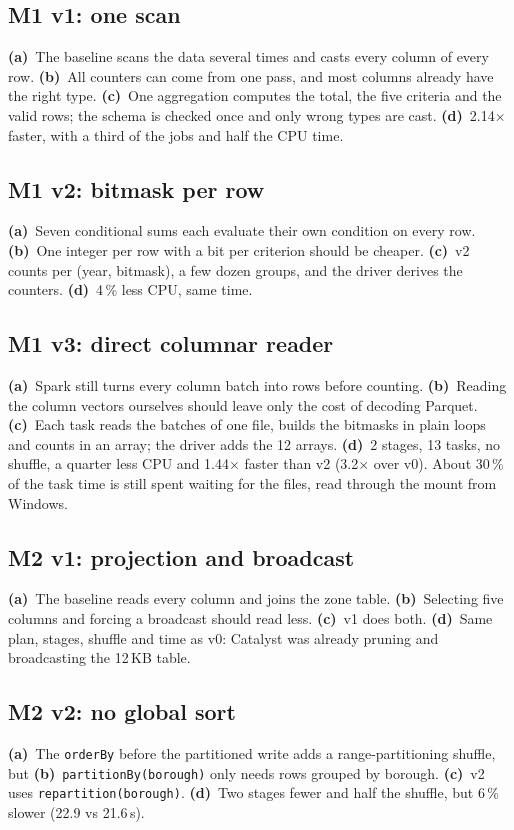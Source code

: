 \documentclass[sigconf]{acmart}
\newcommand{\pa}{\textbf{(a)}~}\newcommand{\pb}{\textbf{(b)}~}\newcommand{\pc}{\textbf{(c)}~}\newcommand{\pd}{\textbf{(d)}~}
\begin{document}
\subsection{M1 v1: one scan}
\pa The baseline scans the data several times and casts every column of every row. \pb All counters can come from one pass, and
most columns already have the right type. \pc One aggregation computes the total, the five criteria and the valid rows; the schema
is checked once and only wrong types are cast. \pd 2.14$\times$ faster, with a third of the jobs and half the CPU time.

\subsection{M1 v2: bitmask per row}
\pa Seven conditional sums each evaluate their own condition on every row. \pb One integer per row with a bit per criterion should be
cheaper. \pc v2 counts per (year, bitmask), a few dozen groups, and the driver derives the counters. \pd 4\,\% less CPU, same time.

\subsection{M1 v3: direct columnar reader}
\pa Spark still turns every column batch into rows before counting. \pb Reading the column vectors ourselves should leave only the
cost of decoding Parquet. \pc Each task reads the batches of one file, builds the bitmasks in plain loops and counts in an array;
the driver adds the 12 arrays. \pd 2 stages, 13 tasks, no shuffle, a quarter less CPU and 1.44$\times$ faster than v2 (3.2$\times$ over v0). About 30\,\% of the task time is still spent waiting for the files, read through the mount from Windows.

\subsection{M2 v1: projection and broadcast}
\pa The baseline reads every column and joins the zone table. \pb Selecting five columns and forcing a broadcast should read less.
\pc v1 does both. \pd Same plan, stages, shuffle and time as v0: Catalyst was already pruning and broadcasting the 12\,KB table.

\subsection{M2 v2: no global sort}
\pa The \texttt{orderBy} before the partitioned write adds a range-partitioning shuffle, but \pb \texttt{partitionBy(borough)} only
needs rows grouped by borough. \pc v2 uses \texttt{repartition(borough)}. \pd Two stages fewer and half the shuffle, but 6\,\% slower (22.9 vs 21.6\,s).
\end{document}
